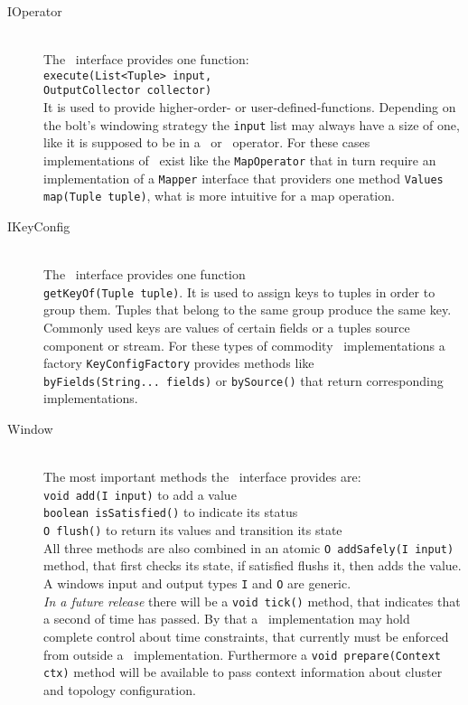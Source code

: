 \begin{description}
	\item[IOperator] \hfill \\
	The \ioperator\ interface provides one function: \\
	\texttt{execute(List<Tuple> input, \\ OutputCollector collector)} \\
	It is used to provide higher-order- or user-defined-functions. Depending on the bolt's windowing strategy the \texttt{input} list may always have a size of one, like it is supposed to be in a \map\ or \filter\ operator. For these cases implementations of \ioperator\ exist like the \texttt{MapOperator} that in turn require an implementation of a \texttt{Mapper} interface that providers one method \texttt{Values map(Tuple tuple)}, what is more intuitive for a map operation.
	\item[IKeyConfig] \hfill \\
	\label{item:ikeyconfig}
	The \ikeyconfig\ interface provides one function \\ \texttt{getKeyOf(Tuple tuple)}. It is used to assign keys to tuples in order to group them. Tuples that belong to the same group produce the same key. Commonly used keys are values of certain fields or a tuples source component or stream. For these types of commodity  \ikeyconfig\ implementations a factory \texttt{KeyConfigFactory} provides methods like \\
	 \texttt{byFields(String... fields)} or \texttt{bySource()} that return corresponding implementations.
	\item[Window] \hfill \\
	The most important methods the \iwindow\ interface provides are:\\
	\texttt{void add(I input)} to add a value \\
	\texttt{boolean isSatisfied()} to indicate its status \\
	\texttt{O flush()} to return its values and transition its state  \\
	All three methods are also combined in an atomic 
	\texttt{O addSafely(I input)}
	method, that first checks its state, if satisfied flushs it, then adds the value.
	A windows input and output types \texttt{I} and \texttt{O} are generic. \\
	\textsl{In a future release} there will be a \texttt{void tick()} method, that indicates that a second of time has passed. By that a \iwindow\ implementation may hold complete control about time constraints, that currently must be enforced from outside a \iwindow\ implementation. Furthermore a \texttt{void prepare(Context ctx)} method will be available to pass context information about cluster and topology configuration. 
\end{description}

